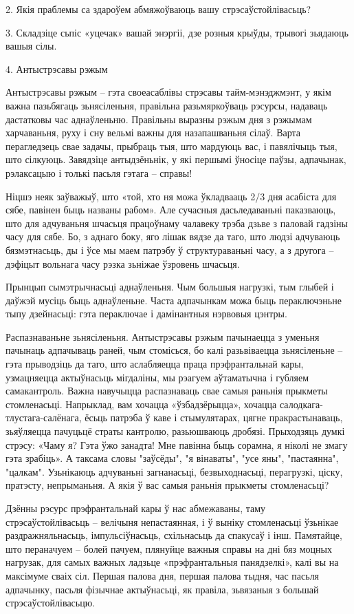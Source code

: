 2. Якія праблемы са здароўем абмяжоўваюць вашу стрэсаўстойлівасьць?

3. Складзіце сьпіс «уцечак» вашай энэргіі, дзе розныя крыўды, трывогі зьядаюць вашыя сілы.


4. Антыстрэсавы рэжым

Антыстрэсавы рэжым – гэта своеасаблівы стрэсавы тайм-мэнэджмэнт, у якім важна пазьбягаць зьнясіленьня, правільна разьмяркоўваць рэсурсы, надаваць дастатковы час аднаўленьню. Правільны выразны рэжым дня з рэжымам харчаваньня, руху і сну вельмі важны для назапашваньня сілаў. Варта перагледзець свае задачы, прыбраць тыя, што мардуюць вас, і павялічыць тыя, што сілкуюць. Завядзіце антыдзёньнік, у які першымі ўносіце паўзы, адпачынак, рэлаксацыю і толькі пасьля гэтага – справы!

Ніцшэ неяк заўважыў, што «той, хто ня можа ўкладвааць 2/3 дня асабіста для сябе, павінен быць названы рабом». Але сучасныя дасьледаваньні паказваюць, што для адчуваньня шчасьця працоўнаму чалавеку трэба дзьве з паловай гадзіны часу для сябе. Бо, з аднаго боку, яго лішак вядзе да таго, што людзі адчуваюць бязмэтнасьць, ды і ўсе мы маем патрэбу ў структураваньні часу, а з другога – дэфіцыт вольнага часу рэзка зьніжае ўзровень шчасьця.

Прынцып сымэтрычнасьці аднаўленьня. Чым большыя нагрузкі, тым глыбей і даўжэй мусіць быць аднаўленьне. Часта адпачынкам можа быць пераключэньне тыпу дзейнасьці: гэта пераключае і дамінантныя нэрвовыя цэнтры.

Распазнаваньне зьнясіленьня. Антыстрэсавы рэжым пачынаецца з уменьня пачынаць адпачываць раней, чым стомісься, бо калі разьвіваецца зьнясіленьне – гэта прыводзіць да таго, што аслабляецца праца прэфрантальнай кары, узмацняецца актыўнасьць мігдаліны, мы рэагуем аўтаматычна і губляем самакантроль. Важна навучыцца распазнаваць свае самыя раньнія прыкметы стомленасьці. Напрыклад, вам хочацца «ўзбадзёрыцца», хочацца салодкага-тлустага-салёнага, ёсьць патрэба ў каве і стымулятарах, цягне пракрастынаваць, зьяўляецца пачуцьцё страты кантролю, разьюшваюць дробязі. Прыходзяць думкі стрэсу: «Чаму я? Гэта ўжо занадта! Мне павінна быць сорамна, я ніколі не змагу гэта зрабіць». А таксама словы "заўсёды", "я вінаваты", "усе яны", "пастаянна", "цалкам". Узьнікаюць адчуваньні загнанасьці, безвыходнасьці, перагрузкі, ціску, пратэсту, непрыманьня. А якія ў вас самыя раньнія прыкметы стомленасьці?

Дзённы рэсурс прэфрантальнай кары ў нас абмежаваны, таму стрэсаўстойлівасьць – велічыня непастаянная, і ў выніку стомленасьці ўзьнікае раздражняльнасьць, імпульсіўнасьць, схільнасьць да спакусаў і інш. Памятайце, што пераначуем – болей пачуем, плянуйце важныя справы на дні бяз моцных нагрузак, для самых важных ладзьце «прэфрантальныя панядзелкі», калі вы на максімуме сваіх сіл. Першая палова дня, першая палова тыдня, час пасьля адпачынку, пасьля фізычнае актыўнасьці, як правіла, зьвязаныя з большай стрэсаўстойлівасьцю.

